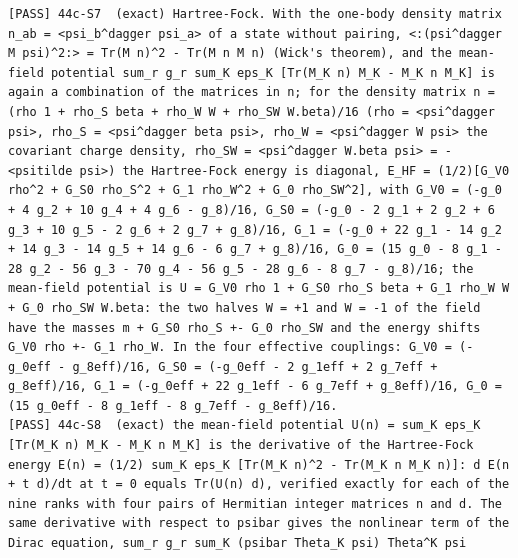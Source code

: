 \documentclass[
  10pt,
]{article}
\begin{document}
\begin{verbatim}
[PASS] 44c-S7  (exact) Hartree-Fock. With the one-body density matrix n_ab = <psi_b^dagger psi_a> of a state without pairing, <:(psi^dagger M psi)^2:> = Tr(M n)^2 - Tr(M n M n) (Wick's theorem), and the mean-field potential sum_r g_r sum_K eps_K [Tr(M_K n) M_K - M_K n M_K] is again a combination of the matrices in n; for the density matrix n = (rho 1 + rho_S beta + rho_W W + rho_SW W.beta)/16 (rho = <psi^dagger psi>, rho_S = <psi^dagger beta psi>, rho_W = <psi^dagger W psi> the covariant charge density, rho_SW = <psi^dagger W.beta psi> = -<psitilde psi>) the Hartree-Fock energy is diagonal, E_HF = (1/2)[G_V0 rho^2 + G_S0 rho_S^2 + G_1 rho_W^2 + G_0 rho_SW^2], with G_V0 = (-g_0 + 4 g_2 + 10 g_4 + 4 g_6 - g_8)/16, G_S0 = (-g_0 - 2 g_1 + 2 g_2 + 6 g_3 + 10 g_5 - 2 g_6 + 2 g_7 + g_8)/16, G_1 = (-g_0 + 22 g_1 - 14 g_2 + 14 g_3 - 14 g_5 + 14 g_6 - 6 g_7 + g_8)/16, G_0 = (15 g_0 - 8 g_1 - 28 g_2 - 56 g_3 - 70 g_4 - 56 g_5 - 28 g_6 - 8 g_7 - g_8)/16; the mean-field potential is U = G_V0 rho 1 + G_S0 rho_S beta + G_1 rho_W W + G_0 rho_SW W.beta: the two halves W = +1 and W = -1 of the field have the masses m + G_S0 rho_S +- G_0 rho_SW and the energy shifts G_V0 rho +- G_1 rho_W. In the four effective couplings: G_V0 = (-g_0eff - g_8eff)/16, G_S0 = (-g_0eff - 2 g_1eff + 2 g_7eff + g_8eff)/16, G_1 = (-g_0eff + 22 g_1eff - 6 g_7eff + g_8eff)/16, G_0 = (15 g_0eff - 8 g_1eff - 8 g_7eff - g_8eff)/16.
[PASS] 44c-S8  (exact) the mean-field potential U(n) = sum_K eps_K [Tr(M_K n) M_K - M_K n M_K] is the derivative of the Hartree-Fock energy E(n) = (1/2) sum_K eps_K [Tr(M_K n)^2 - Tr(M_K n M_K n)]: d E(n + t d)/dt at t = 0 equals Tr(U(n) d), verified exactly for each of the nine ranks with four pairs of Hermitian integer matrices n and d. The same derivative with respect to psibar gives the nonlinear term of the Dirac equation, sum_r g_r sum_K (psibar Theta_K psi) Theta^K psi

\end{verbatim}
\end{document}
